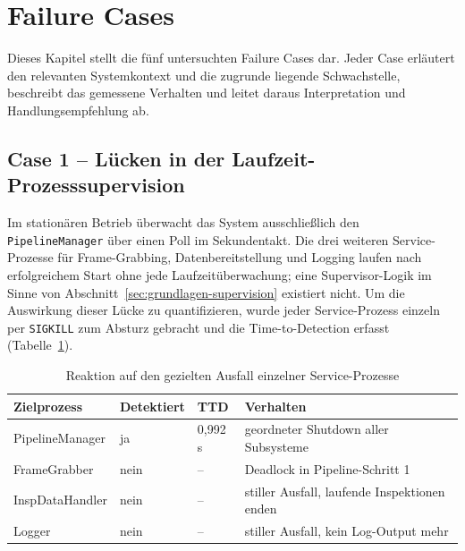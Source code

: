 
\section{Failure Cases}
\label{sec:cases}

Dieses Kapitel stellt die fünf untersuchten Failure Cases dar. Jeder Case erläutert den
relevanten Systemkontext und die zugrunde liegende Schwachstelle, beschreibt das gemessene
Verhalten und leitet daraus Interpretation und Handlungsempfehlung ab.


\subsection{Case 1 -- Lücken in der Laufzeit-Prozesssupervision}
\label{sec:case1}

Im stationären Betrieb überwacht das System ausschließlich den \texttt{PipelineManager}
über einen Poll im Sekundentakt. Die drei weiteren Service-Prozesse für Frame-Grabbing,
Datenbereitstellung und Logging laufen nach erfolgreichem Start ohne jede
Laufzeitüberwachung; eine Supervisor-Logik im Sinne von
Abschnitt~\ref{sec:grundlagen-supervision} existiert nicht. Um die Auswirkung dieser
Lücke zu quantifizieren, wurde jeder Service-Prozess einzeln per \texttt{SIGKILL} zum
Absturz gebracht und die Time-to-Detection erfasst (Tabelle~\ref{tab:case1}).

\begin{table}[htbp]
    \centering
    \caption{Reaktion auf den gezielten Ausfall einzelner Service-Prozesse}
    \label{tab:case1}
    \begin{tabularx}{\textwidth}{lllX}
        \hline
        \textbf{Zielprozess} & \textbf{Detektiert} & \textbf{TTD} & \textbf{Verhalten} \\
        \hline
        PipelineManager  & ja   & 0,992\,s & geordneter Shutdown aller Subsysteme \\
        FrameGrabber     & nein & --       & Deadlock in Pipeline-Schritt 1 \\
        InspDataHandler  & nein & --       & stiller Ausfall, laufende Inspektionen enden \\
        Logger           & nein & --       & stiller Ausfall, kein Log-Output mehr \\
        \hline
    \end{tabularx}
\end{table}

